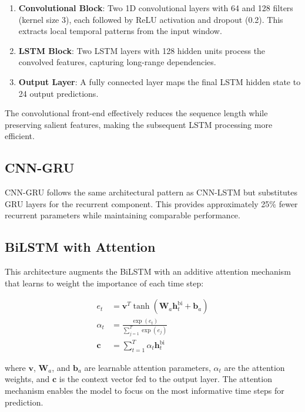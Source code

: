 \begin{enumerate}
    \item \textbf{Convolutional Block}: Two 1D convolutional layers with 64 and 128 filters (kernel size 3), each followed by ReLU activation and dropout (0.2). This extracts local temporal patterns from the input window.
    \item \textbf{LSTM Block}: Two LSTM layers with 128 hidden units process the convolved features, capturing long-range dependencies.
    \item \textbf{Output Layer}: A fully connected layer maps the final LSTM hidden state to 24 output predictions.
\end{enumerate}

The convolutional front-end effectively reduces the sequence length while preserving salient features, making the subsequent LSTM processing more efficient.

\subsection{CNN-GRU}

CNN-GRU follows the same architectural pattern as CNN-LSTM but substitutes GRU layers for the recurrent component. This provides approximately 25\% fewer recurrent parameters while maintaining comparable performance.

\subsection{BiLSTM with Attention}

This architecture augments the BiLSTM with an additive attention mechanism that learns to weight the importance of each time step:

\begin{align}
    e_t &= \mathbf{v}^T \tanh(\mathbf{W}_a \mathbf{h}_t^{\text{bi}} + \mathbf{b}_a) \\
    \alpha_t &= \frac{\exp(e_t)}{\sum_{j=1}^{T} \exp(e_j)} \\
    \mathbf{c} &= \sum_{t=1}^{T} \alpha_t \mathbf{h}_t^{\text{bi}}
\end{align}

where $\mathbf{v}$, $\mathbf{W}_a$, and $\mathbf{b}_a$ are learnable attention parameters, $\alpha_t$ are the attention weights, and $\mathbf{c}$ is the context vector fed to the output layer. The attention mechanism enables the model to focus on the most informative time steps for prediction.

